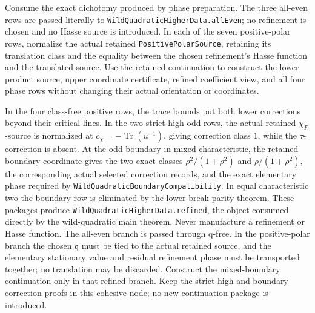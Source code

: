 \begin{theorem}
\label{mod:cases-wildquadratic-refinementpreparation}
Consume the exact dichotomy produced by phase preparation.  The three
all-even rows are passed literally to
\texttt{WildQuadraticHigherData.allEven}; no refinement is chosen and no
Hasse source is introduced.  In each of the seven positive-polar rows,
normalize the actual retained \texttt{PositivePolarSource}, retaining its
translation class and the equality between the chosen refinement's Hasse
function and the translated source.  Use the retained continuation to
construct the lower product source, upper coordinate certificate, refined
coefficient view, and all four phase rows without changing their actual
orientation or coordinates.

In the four class-free positive rows, the trace bounds put both lower
corrections beyond their critical lines.  In the two strict-high odd rows,
the actual retained \(\chi_F\)-source is normalized at
\(c_\chi=-\operatorname{Tr}(u^{-1})\), giving correction class \(1\), while
the \(\tau\)-correction is absent.  At the odd boundary in mixed
characteristic, the retained boundary coordinate gives the two exact
classes
\(\rho^2/(1+\rho^2)\) and \(\rho/(1+\rho^2)\), the corresponding actual
selected correction records, and the exact elementary phase required by
\texttt{WildQuadraticBoundaryCompatibility}.  In equal characteristic two
the boundary row is eliminated by the lower-break parity theorem.  These
packages produce \texttt{WildQuadraticHigherData.refined}, the object
consumed directly by the wild-quadratic main theorem.
\leanok
{}
\FormalizationContract
Never manufacture a refinement or Hasse function.  The all-even branch is
passed through q-free.  In the positive-polar branch the chosen
\(\mathfrak q\) must be tied to the actual retained source, and the
elementary stationary value and residual refinement phase must be
transported together; no translation may be discarded.  Construct the
mixed-boundary continuation only in that refined branch.  Keep the
strict-high and boundary correction proofs in this cohesive node; no new
continuation package is introduced.
\end{theorem}
